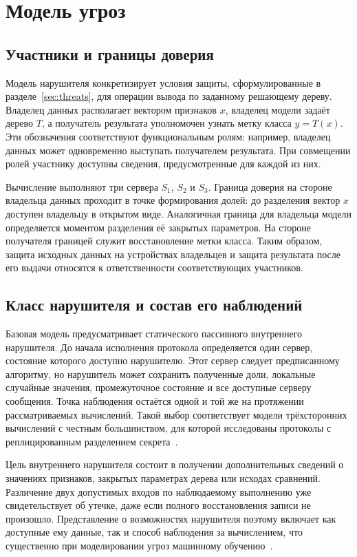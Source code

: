 \section{Модель угроз}
\label{sec:adversary}

\subsection{Участники и границы доверия}

Модель нарушителя конкретизирует условия защиты, сформулированные
в разделе~\ref{sec:threats}, для операции вывода по заданному решающему
дереву. Владелец данных располагает вектором признаков $x$, владелец
модели задаёт дерево $T$, а получатель результата уполномочен узнать
метку класса $y=T(x)$. Эти обозначения соответствуют функциональным
ролям: например, владелец данных может одновременно выступать получателем
результата. При совмещении ролей участнику доступны сведения,
предусмотренные для каждой из них.

Вычисление выполняют три сервера $S_1$, $S_2$ и $S_3$. Граница доверия
на стороне владельца данных проходит в точке формирования долей: до
разделения вектор $x$ доступен владельцу в открытом виде. Аналогичная
граница для владельца модели определяется моментом разделения её закрытых
параметров. На стороне получателя границей служит восстановление метки
класса. Таким образом, защита исходных данных на устройствах владельцев
и защита результата после его выдачи относятся к ответственности
соответствующих участников.

\subsection{Класс нарушителя и состав его наблюдений}

Базовая модель предусматривает статического пассивного внутреннего
нарушителя. До начала исполнения протокола определяется один сервер,
состояние которого доступно нарушителю. Этот сервер следует предписанному
алгоритму, но нарушитель может сохранить полученные доли, локальные
случайные значения, промежуточное состояние и все доступные серверу
сообщения. Точка наблюдения остаётся одной и той же на протяжении
рассматриваемых вычислений. Такой выбор соответствует модели трёхсторонних
вычислений с честным большинством, для которой исследованы протоколы
с реплицированным разделением секрета~\cite{araki2016,mohassel2018aby3}.

Цель внутреннего нарушителя состоит в получении дополнительных сведений
о значениях признаков, закрытых параметрах дерева или исходах сравнений.
Различение двух допустимых входов по наблюдаемому выполнению уже
свидетельствует об утечке, даже если полного восстановления записи
не произошло. Представление о возможностях нарушителя поэтому включает
как доступные ему данные, так и способ наблюдения за вычислением, что
существенно при моделировании угроз машинному обучению~\cite{podtopelny2024}.

